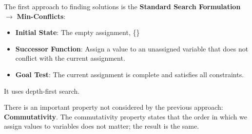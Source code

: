 \documentclass[12pt]{article}
\begin{document}
\begin{enumerate}
          The first approach to finding solutions is the \textbf{Standard Search Formulation} $\rightarrow$ \textbf{Min-Conflicts}:
          \begin{itemize}
              \item \textbf{Initial State}: The empty assignment, \{\}
              \item \textbf{Successor Function}: Assign a value to an unassigned variable that does not conflict with the current assignment.
              \item \textbf{Goal Test}: The current assignment is complete and satisfies all constraints.
          \end{itemize}
          It uses depth-first search.

          There is an important property not considered by the previous approach: \textbf{Commutativity}.
          The commutativity property states that the order in which we assign values to variables does not matter; the result is the same.


\end{enumerate}
\end{document}
